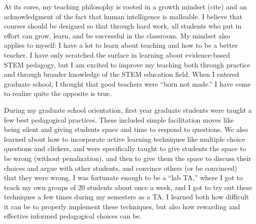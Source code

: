 \documentclass[11pt]{article}
\begin{document}
\thispagestyle{fancy}

At its cores, my teaching philosophy is rooted in a growth mindset (cite) and an acknowledgment of the fact that human intelligence is malleable. 
I believe that courses should be designed so that through hard work, all students who put in effort can grow, learn, and be successful in the classroom.
My mindset also applies to myself: I have a lot to learn about teaching and how to be a better teacher.
I have only scratched the surface in learning about evidence-based STEM pedagogy, but I am excited to improve my teaching both through practice and through broader knowledge of the STEM education field.
When I entered graduate school, I thought that good teachers were “born not made.” 
I have come to realize quite the opposite is true. 

During my graduate school orientation, first year graduate students were taught a few best pedagogical practices. 
These included  simple facilitation moves like being silent and giving students space and time to respond to questions. 
We also learned about how to  incorporate active learning techniques like multiple choice questions and clickers, and were specifically taught to give students the space to be wrong (without penalization), and then to give them the space to discuss their choices and argue with other students, and convince others (or be convinced) that they were wrong. 
I was fortunate enough to be a “lab TA,” where I got to teach my own groups of 20 students about once a week, and I got to try out these techniques a few times during my semesters as a TA. 
I learned both how difficult it can be to properly implement these techniques, but also how rewarding and effective informed pedagogical choices can be.
\end{document}

